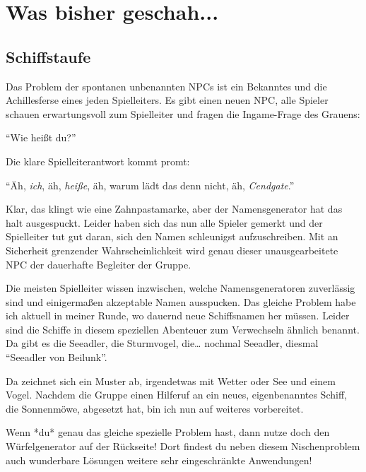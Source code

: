 \documentclass[final]{multiversum}
\begin{document}
\makemultititle
%

\section{Was bisher geschah...}

\subsection{Schiffstaufe}
Das Problem der spontanen unbenannten NPCs ist ein Bekanntes und die Achillesferse eines jeden Spielleiters.
Es gibt einen neuen NPC, alle Spieler schauen erwartungsvoll zum Spielleiter und fragen die Ingame-Frage des Grauens:

\enquote{Wie heißt du?}

Die klare Spielleiterantwort kommt promt:

\enquote{Äh, \textit{ich}, äh, \textit{heiße}, äh, warum lädt das denn nicht, äh, \textit{Cendgate}.}

Klar, das klingt wie eine Zahnpastamarke, aber der Namensgenerator hat das halt ausgespuckt.
Leider haben sich das nun alle Spieler gemerkt und der Spielleiter tut gut daran, sich den Namen schleunigst aufzuschreiben.
Mit an Sicherheit grenzender Wahrscheinlichkeit wird genau dieser unausgearbeitete NPC der dauerhafte Begleiter der Gruppe.

Die meisten Spielleiter wissen inzwischen, welche Namensgeneratoren zuverlässig sind und einigermaßen akzeptable Namen ausspucken.
Das gleiche Problem habe ich aktuell in meiner Runde, wo dauernd neue Schiffsnamen her müssen.
Leider sind die Schiffe in diesem speziellen Abenteuer zum Verwechseln ähnlich benannt.
Da gibt es die Seeadler, die Sturmvogel, die\dots{ }nochmal Seeadler, diesmal \enquote{Seeadler von Beilunk}.

Da zeichnet sich ein Muster ab, irgendetwas mit Wetter oder See und einem Vogel.
Nachdem die Gruppe einen Hilferuf an ein neues, eigenbenanntes Schiff, die Sonnenmöwe, abgesetzt hat, bin ich nun auf weiteres vorbereitet.

Wenn *du* genau das gleiche spezielle Problem hast, dann nutze doch den Würfelgenerator auf der Rückseite!
Dort findest du neben diesem Nischenproblem auch wunderbare Lösungen weitere sehr eingeschränkte Anwendungen!
\pagebreak
\end{document}

